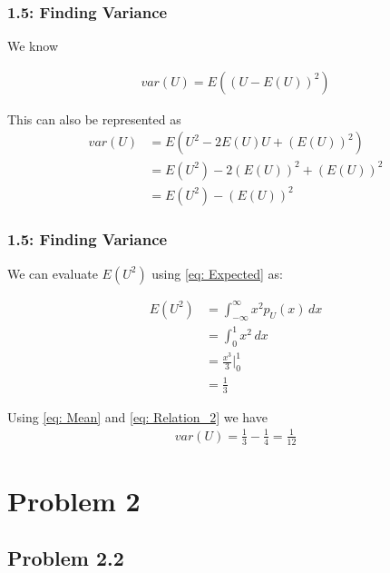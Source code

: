 \documentclass{beamer}
\begin{document}
\begin{frame}
	\frametitle{1.5: Finding Variance}
	We know

	\begin{align}
		var(U) = E((U - E(U))^2)
	\end{align}

	This can also be represented as
	\begin{align}
		var(U) &= E(U^2 - 2E(U)U + (E(U))^2) \\
		&= E(U^2) - 2(E(U))^2 + (E(U))^2 \\
		&= E(U^2) - (E(U))^2
		\label{eq: Relation_2}
	\end{align}
	
\end{frame}

\begin{frame}
	\frametitle{1.5: Finding Variance}
	We can evaluate $E(U^2)$ using \eqref{eq: Expected} as:
	
	\begin{align}
		E(U^2) &= \int_{-\infty}^{\infty} x^2 p_U(x) \,dx \\
		&= \int_{0}^{1} x^2 \,dx \\
		&= \frac{x^3}{3} \big|^{1}_{0} \\
		&= \frac{1}{3}
	\end{align}

	Using \eqref{eq: Mean} and \eqref{eq: Relation_2} we have
	\begin{align}
		var(U) = \frac{1}{3} - \frac{1}{4} = \frac{1}{12}
	\end{align}

\end{frame}


\section{Problem 2}

\subsection{Problem 2.2}
\end{document}
